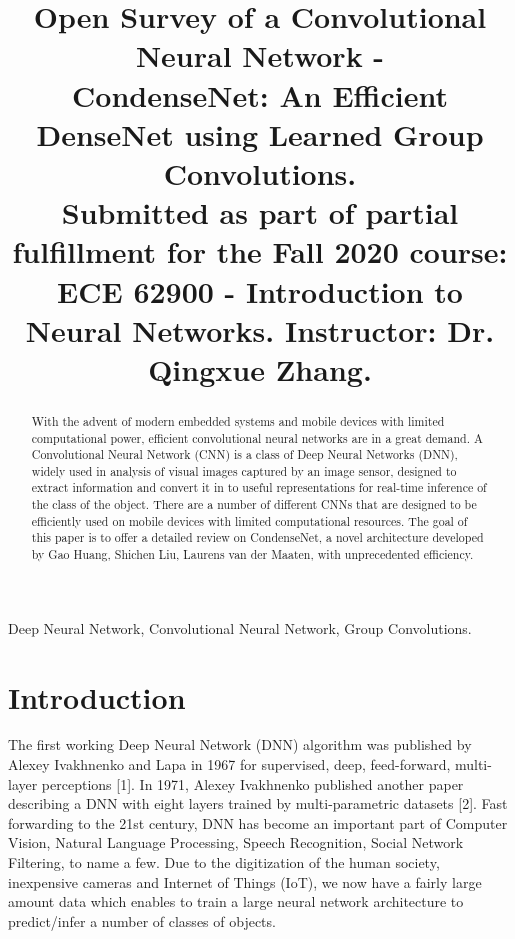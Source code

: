 \documentclass[conference]{IEEEtran}
\begin{document}
\title{Open Survey of a Convolutional Neural Network -
\\CondenseNet: An Efficient DenseNet using Learned Group Convolutions.\\
{\footnotesize Submitted as part of partial fulfillment for the Fall 2020 course: ECE 62900 - Introduction to Neural Networks. Instructor: Dr. Qingxue Zhang.}
}

\author{
}

\maketitle

\begin{abstract}
With the advent of modern embedded systems and mobile devices with limited computational power, efficient convolutional neural networks are in a great demand. A Convolutional Neural Network (CNN) is a class of Deep Neural Networks (DNN), widely used in analysis of visual images captured by an image sensor, designed to extract information and convert it in to useful representations for real-time inference of the class of the object. There are a number of different CNNs that are designed to be efficiently used on mobile devices with limited computational resources. The goal of this paper is to offer a detailed review on CondenseNet, a novel architecture developed by Gao Huang, Shichen Liu, Laurens van der Maaten, with unprecedented efficiency.\\
\end{abstract}

\begin{IEEEkeywords}
Deep Neural Network, Convolutional Neural Network, Group Convolutions.
\end{IEEEkeywords}

\section{\textbf{Introduction}}
The first working Deep Neural Network (DNN) algorithm was published by Alexey Ivakhnenko and Lapa in 1967 for supervised, deep, feed-forward,
multi-layer perceptions [1]. In 1971, Alexey Ivakhnenko published another paper describing a DNN with eight layers trained
by multi-parametric datasets [2]. Fast forwarding to the 21st century, DNN has become an important part of Computer
Vision, Natural Language Processing, Speech Recognition, Social Network Filtering, to name a few. Due to the digitization
of the human society, inexpensive cameras and Internet of Things (IoT), we now have a fairly large amount data which
enables to train a large neural network architecture to predict/infer a number of classes of objects.
\end{document}
